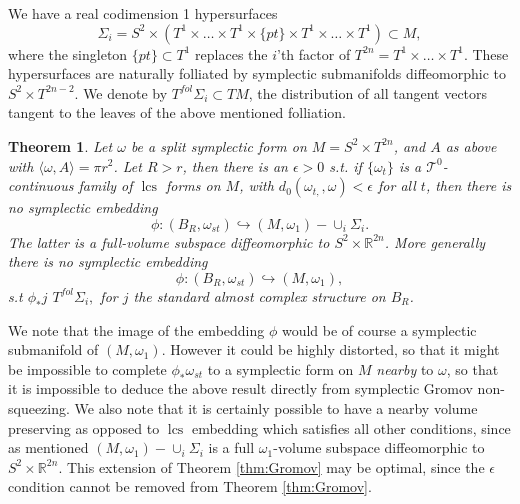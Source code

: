 \documentclass{amsart}
\numberwithin{equation}{section}
\newtheorem{theorem}[equation]{Theorem}
\theoremstyle{definition}
\theoremstyle{remark}
\DeclareMathOperator{\lcs}{lcs}
\begin{document}
We have a real codimension 1 hypersurfaces $$\Sigma _{i} =S ^{2}  \times  (T ^{1} \times \ldots \times T ^{1}  \times   \{pt \} \times T ^{1}   \times \ldots \times T ^{1})   \subset M,   $$ where the singleton $\{pt\} \subset T ^{1}  $ replaces the $i$'th factor of $T ^{2n}= T ^{1} \times \ldots \times T ^{1}  $. These  hypersurfaces are naturally folliated by symplectic submanifolds diffeomorphic to $S ^{2} \times T ^{2n-2}  $. We denote by $T ^{fol} \Sigma _{i} \subset TM  $, the distribution of all tangent vectors tangent to the leaves of the above mentioned folliation.
\begin{theorem} \label{cor:nonsqueezing} Let $\omega$ be a split symplectic form on $M =S ^{2} \times T ^{2n}  $,  and $A$ as above with $ \langle \omega, A\rangle = \pi r ^{2} $. Let $R>r$, then there is an $\epsilon>0$ s.t. if $\{\omega _{t} \} $ is a $\mathcal{T} ^{0} $-continuous family of $\lcs$ forms on $M$, with $d _{0}  (\omega _{t,}, \omega ) < \epsilon$ for all $t$, then
there is no symplectic embedding $$\phi: (B _{R}, \omega _{st})  \hookrightarrow (M, \omega _{1}) - \cup _{i} \Sigma_i. $$ The latter is a full-volume subspace diffeomorphic to $S ^{2} \times \mathbb{R} ^{2n}  $.
More generally there is no symplectic embedding $$\phi: (B _{R}, \omega _{st})  \hookrightarrow (M, \omega _{1}), $$  s.t 
   $\phi _{*} j$    $T ^{fol} \Sigma _{i},$ for $j$ the standard almost complex structure on $B _{R}$. 
\end{theorem}
We note that the image of the embedding $\phi$ would be of course a symplectic submanifold of  $(M, \omega _{1} )$. However it could be highly distorted, so that it might be impossible to complete $\phi _{*} \omega _{st}  $ to a symplectic form on $M$ \emph{nearby} to  $\omega$, so that it is impossible to deduce the above result directly from symplectic Gromov non-squeezing. We also note that it is certainly possible to have a nearby volume preserving as opposed to $\lcs$ embedding which satisfies all other conditions, since as mentioned $(M, \omega _{1}) - \cup _{i} \Sigma_i$ is a full $\omega _{1} $-volume subspace diffeomorphic to $S ^{2} \times \mathbb{R} ^{2n}  $. This extension of Theorem \ref{thm:Gromov} may be optimal, since the $\epsilon$ condition cannot be removed from Theorem \ref{thm:Gromov}.
\end{document}
